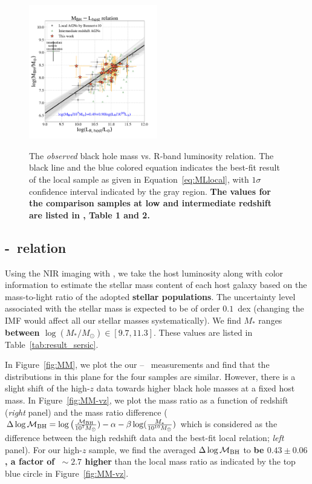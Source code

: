 \documentclass[apj]{emulateapj}
\begin{document}
\begin{figure}
\centering
{\includegraphics[width=0.5\textwidth]{fig/MBH-L_obs.pdf}}
\caption{\label{fig:ML} 
The {\it observed} black hole mass vs. R-band luminosity relation. The black line and the blue colored equation indicates the best-fit result of the local sample as given in Equation~\ref{eq:MLlocal}, with $1\sigma$ confidence interval indicated by the gray region. {\bf The values for the comparison samples at low and intermediate redshift are listed in \citet{Ding2017b}, Table 1 and 2.}
}
\end{figure} 

\subsection{\mbh-\smass\ relation}\label{sec:mm}

Using the NIR imaging with \hst, we take the host luminosity along with color information to estimate the stellar mass content of each host galaxy based on the mass-to-light ratio of the adopted  {\bf stellar populations}. The uncertainty level associated with the stellar mass is expected to be of order $0.1$~dex (changing the IMF would affect all our stellar masses systematically). We find $M_*$ ranges {\bf between $\log (M_*/M_{\odot}) \in [9.7, 11.3]$}. These values are listed in Table~\ref{tab:result_sersic}. 

In Figure~\ref{fig:MM}, we plot the our \mbh -- \smass\ measurements and find that the distributions in this plane for the four samples are similar. However, there is a slight shift of the high-$z$ data towards higher black hole masses at a fixed host mass. In Figure~\ref{fig:MM-vz}, we plot the mass ratio as a function of redshift ({\it right} panel) and the mass ratio difference ($\Delta \log \mathcal M_{\rm BH} = \log \big( \frac{\mathcal M_{\rm  BH}}{10^{7}M_{\odot}}) -\alpha-\beta\log(\frac{M_*}{10^{10}M_{\odot}})$ which is considered as the difference between the high redshift data and the best-fit local relation; {\it left} panel). For our high-$z$ sample, we find the averaged $\Delta \log \mathcal M_{\rm BH}$ to {\bf be $0.43\pm0.06$, a factor of $~\sim2.7$ higher} than the local mass ratio as indicated by the top blue circle in Figure~\ref{fig:MM-vz}.
\end{document}
